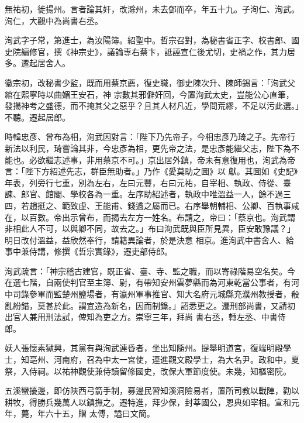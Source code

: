 \begin{pinyinscope}
 無祐初，徙揚州。言者論其奸，改滁州，未去鄧而卒，年五十九。子洵仁、洵武。洵仁，大觀中為尚書右丞。



 洵武字子常，第進士，為汝陽簿。紹聖中。哲宗召對，為秘書省正字、校書郎、國史院編修官，撰《神宗史》，議論專右蔡卞，詆誣宣仁後尤切，史禍之作，其力居多。遷起居舍人。



 徽宗初，改秘書少監，既而用蔡京薦，復史職，御史陳次升、陳師錫言：「洵武父綰在熙寧時以曲媚王安石，神
 宗數其邪僻奸回，今置洵武太史，豈能公心直筆，發揚神考之盛德，而不掩其父之惡乎？且其人材凡近，學問荒繆，不足以污此選。」不聽。遷起居郎。



 時韓忠彥、曾布為相，洵武因對言：「陛下乃先帝子，今相忠彥乃琦之子。先帝行新法以利民，琦嘗論其非，今忠彥為相，更先帝之法，是忠彥能繼父志，陛下為不能也。必欲繼志述事，非用蔡京不可。」京出居外鎮，帝未有意復用也，洵武為帝言：「陛下方紹述先志，群臣無助者。」乃作《愛莫助之圖》以
 獻。其圖如《史記》年表，列旁行七重，別為左右，左曰元豐，右曰元祐，自宰相、執政、侍從、臺諫、郎官、館閣、學校各為一重。左序助紹述者，執政中唯溫益一人，餘不過三四，若趙挺之、範致虛、王能甫、錢遹之屬而已。右序舉朝輔相、公卿、百執事咸在，以百數。帝出示曾布，而揭去左方一姓名。布請之，帝曰：「蔡京也。洵武謂非相此人不可，以與卿不同，故去之。」布曰洵武既與臣所見異，臣安敢豫議？」明日改付溫益，益欣然奉行，請籍異論者，於是決意
 相京。進洵武中書舍人、給事中兼侍講，修撰《哲宗實錄》，遷吏部侍郎。



 洵武疏言：「神宗稽古建官，既正省、臺、寺、監之職，而以寄祿階易空名矣。今在選七階，自兩使判官至主簿、尉，有帶知安州雲夢縣而為河東乾當公事者，有河中司錄參軍而監楚州鹽場者，有瀛州軍事推官、知大名府元城縣充濮州教授者，殽亂紛錯，莫甚於此。謂宜造為新名，因而制錄。」詔悉更之。遷刑部尚書，又請初出官人兼用刑法試，俾知為吏之方。崇寧三年，拜尚
 書右丞，轉左丞、中書侍郎。



 妖人張懷素獄興，其黨有與洵武連昏者，坐出知隨州。提舉明道宮，復端明殿學士，知亳州、河南府，召為中太一宮使，連進觀文殿學士，為大名尹。政和中，夏祭，入侍祠。以祐神觀使兼侍讀留修國史，改保大軍節度使。未幾，知樞密院。



 五溪蠻擾邊，即仿陜西弓箭手制，募邊民習知溪洞險易者，置所司教以戰陣，勸以耕牧，得勝兵幾萬人以鎮撫之。遷特進，拜少保，封莘國公，恩典如宰相。宣和元年，薨，年六十五，贈
 太傅，謚曰文簡。




\end{pinyinscope}
